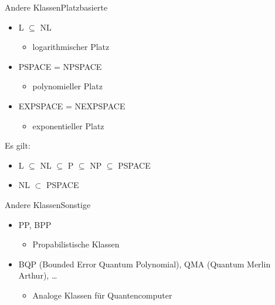 \documentclass[ignorenonframetext,]{beamer}
\begin{document}
\begin{frame}{Andere Klassen}{Platzbasierte}

\begin{itemize}
\itemsep1pt\parskip0pt
\item
  L $\subseteq$ NL

  \begin{itemize}
  \itemsep1pt\parskip0pt
  \item
    logarithmischer Platz
  \end{itemize}
\item
  PSPACE = NPSPACE

  \begin{itemize}
  \itemsep1pt\parskip0pt
  \item
    polynomieller Platz
  \end{itemize}
\item
  EXPSPACE = NEXPSPACE

  \begin{itemize}
  \itemsep1pt\parskip0pt
  \item
    exponentieller Platz
  \end{itemize}
\end{itemize}

Es gilt:

\begin{itemize}
\itemsep1pt\parskip0pt
\item
  L $\subseteq$ NL $\subseteq$ P $\subseteq$ NP $\subseteq$ PSPACE
\item
  NL $\subset$ PSPACE
\end{itemize}

\end{frame}

\begin{frame}{Andere Klassen}{Sonstige}
\begin{itemize}
	\item PP, BPP
		\begin{itemize}
			\item Propabilistische Klassen
		\end{itemize}
	\item BQP (Bounded Error Quantum Polynomial), QMA (Quantum Merlin Arthur), \ldots{}
		\begin{itemize}
			\item Analoge Klassen für Quantencomputer
		\end{itemize}
\end{itemize}
\end{frame}
\end{document}

